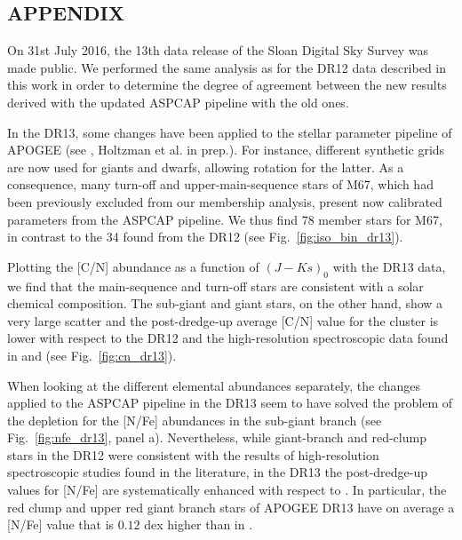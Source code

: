 \documentclass[a4paper,fleqn,usenatbib]{mnras}
\begin{document}


\appendix

\renewcommand\thefigure{A.\arabic{figure}}
\setcounter{figure}{0}
\renewcommand\thetable{A.\arabic{table}}

\newpage
\subsection*{APPENDIX}

On 31st July 2016, the 13th data release of the Sloan Digital Sky Survey was made public. We performed the same analysis as for the DR12 data described in this work in order to determine the  degree of agreement between the new results derived with the updated ASPCAP pipeline with the old ones.

In the DR13, some changes have been applied to the stellar parameter pipeline of APOGEE (see \citealt{sdss2016}, Holtzman et al. in prep.). For instance, different synthetic grids are now used for giants and dwarfs, allowing rotation for the latter. As a consequence, many turn-off and upper-main-sequence stars of M67, which had been previously excluded from our membership analysis, present now calibrated parameters from the ASPCAP pipeline. We thus find 78 member stars for M67, in contrast to the 34 found from the DR12 (see Fig.~\ref{fig:iso_bin_dr13}).

Plotting the [C/N] abundance as a function of $(J-Ks)_0$ with the DR13 data, we find that the main-sequence and turn-off stars are consistent with a solar chemical composition. The sub-giant and giant stars, on the other hand, show a very large scatter and the post-dredge-up average [C/N] value for the cluster is lower with respect to the DR12 and the high-resolution spectroscopic data found in \citet{shetrone2000} and \citet{tautv2000} (see Fig.~\ref{fig:cn_dr13}).

When looking at the different elemental abundances separately, the changes applied to the ASPCAP pipeline in the DR13 seem to have solved the problem of the depletion for the [N/Fe] abundances in the sub-giant branch (see Fig.~\ref{fig:nfe_dr13}, panel a). Nevertheless, while giant-branch and red-clump stars in the DR12 were consistent with the results of high-resolution spectroscopic studies found in the literature, in the DR13 the post-dredge-up values for [N/Fe] are systematically enhanced with respect to \citet{tautv2000}. In particular, the red clump and upper red giant branch stars of APOGEE DR13 have on average a [N/Fe] value that is $0.12$ dex higher than in \citet{tautv2000}. 
\end{document}
